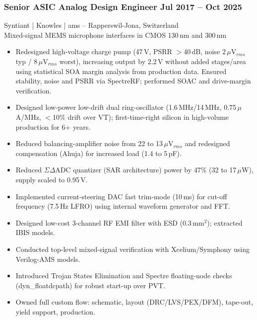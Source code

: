 \documentclass[11pt,a4paper]{article}
\begin{document}
	\subsubsection*{Senior ASIC Analog Design Engineer \hfill Jul 2017 -- Oct 2025}
	Syntiant | Knowles | ams -- Rapperswil-Jona, Switzerland \\
	Mixed-signal MEMS microphone interfaces in CMOS 130\,nm and 300\,nm
	\begin{itemize}
		\item Redesigned high-voltage charge pump (47\,V, PSRR $>$40\,dB, noise 2\,$\mu$V$_{rms}$ typ / 8\,$\mu$V$_{rms}$ worst), increasing output by 2.2\,V without added stages/area using statistical SOA margin analysis from production data. Ensured stability, noise and PSRR via SpectreRF; performed SOAC and drive-margin verification.
		\item Designed low-power low-drift dual ring-oscillator (1.6\,MHz/14\,MHz, 0.75\,$\mu$A/MHz, $<$10\% drift over VT); first-time-right silicon in high-volume production for 6+ years.
		\item Reduced balancing-amplifier noise from 22 to 13\,$\mu$V$_{rms}$ and redesigned compensation (Ahuja) for increased load (1.4 to 5\,pF).
		\item Reduced ${\Sigma}{\Delta}$ADC quantizer (SAR architecture) power by 47\% (32 to 17\,$\mu$W), supply scaled to 0.95\,V.
		\item Implemented current-steering DAC fast trim-mode (10\,ms) for cut-off frequency (7.5\,Hz LFRO) using internal waveform generator and FFT.
		\item Designed low-cost 3-channel RF EMI filter with ESD (0.3\,mm$^2$); extracted IBIS models.
		\item Conducted top-level mixed-signal verification with Xcelium/Symphony using Verilog-AMS models.
		\item Introduced Trojan States Elimination and Spectre floating-node checks (dyn\_floatdcpath) for robust start-up over PVT.
		\item Owned full custom flow: schematic, layout (DRC/LVS/PEX/DFM), tape-out, yield support, production.
	\end{itemize}
	
\end{document}
